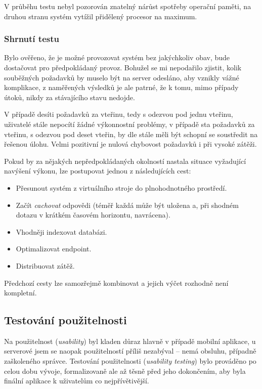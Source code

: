 V průběhu testu nebyl pozorován znatelný nárůst spotřeby operační paměti, na druhou stranu systém vytížil přidělený procesor na maximum.

\subsubsection{Shrnutí testu}
Bylo ověřeno, že je možné provozovat systém bez jakýchkoliv obav, bude dostačovat pro předpokládaný provoz. Bohužel se mi nepodařilo zjistit, kolik souběžných požadavků by muselo být na server odesláno, aby vznikly vážné komplikace, z naměřených výsledků je ale patrné, že k tomu, mimo případy útoků, nikdy za stávajícího stavu nedojde.

V případě desíti požadavků za vteřinu, tedy s odezvou pod jednu vteřinu, uživatelé stále nepocítí žádné výkonnostní problémy, v případě sta požadavků za vteřinu, s odezvou pod deset vteřin, by dle \cite{PagesizeUseit} stále měli být schopní se soustředit na řešenou úlohu. Velmi pozitivní je nulová chybovost požadavků i při vysoké zátěži.

Pokud by za nějakých nepředpokládaných okolností nastala situace vyžadující navýšení výkonu, lze postupovat jednou z následujících cest:
\begin{itemize}
 \item Přesunout systém z virtuálního stroje do plnohodnotného prostředí.
 \item Začít \textit{cachovat} odpovědi (téměř každá může být uložena a, při shodném dotazu v krátkém časovém horizontu, navrácena).
 \item Vhodněji indexovat databázi.
 \item Optimalizovat  endpoint.
 \item Distribuovat zátěž.
\end{itemize}
Předchozí cesty lze samozřejmě kombinovat a jejich výčet rozhodně není kompletní.


\subsection{Testování použitelnosti}
Na použitelnost (\textit{usability}) byl kladen důraz hlavně v případě mobilní aplikace, u serverové jsem se naopak použitelností příliš nezabýval -- nemá obsluhu, případně zaškoleného správce. Testování použitelnosti (\textit{usability testing}) bylo prováděno po celou dobu vývoje, formalizovaně ale až těsně před jeho dokončením, aby byla finální aplikace k uživatelům co nejpřívětivější.

